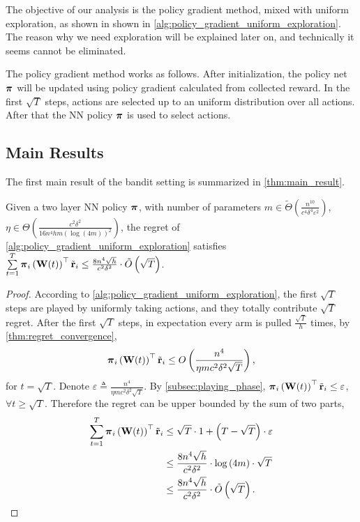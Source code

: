 The objective of our analysis is the policy gradient method, mixed with uniform exploration, as shown in shown in \cref{alg:policy_gradient_uniform_exploration}. The reason why we need exploration will be explained later on, and technically it seems cannot be eliminated.

The policy gradient method works as follows. After initialization, the policy net ${\boldsymbol{\pi}}$ will be updated using policy gradient calculated from collected reward. In the first $\sqrt{T}$ steps, actions are selected up to an uniform distribution over all actions. After that the NN policy ${\boldsymbol{\pi}}$ is used to select actions.

\subsection{Main Results}
\label{subsec:main_results}

The first main result of the bandit setting is summarized in \cref{thm:main_result}.

\begin{thm}
\label{thm:main_result}
    Given a two layer NN policy ${\boldsymbol{\pi}}$, with number of parameters $m \in \tilde{\Theta}\left( \frac{n^{10}}{c^4 \delta^4 \varepsilon^2} \right)$, $\eta \in \Theta\left( \frac{c^2 \delta^2}{16 n^4 h m \left( \log{\left(4m\right)} \right)^2} \right)$, the regret of \cref{alg:policy_gradient_uniform_exploration} satisfies $\sum\limits_{t=1}^{T}{ {\boldsymbol{\pi}}_i\left( {\mathbf{W}}(t) \right)^\top {\tilde{\mathbf{r}}}_i } \le  \frac{8 n^4 \sqrt{h}}{c^2 \delta^2} \cdot \tilde{O}\left( \sqrt{T} \right)$.
\end{thm}
\begin{proof}
According to \cref{alg:policy_gradient_uniform_exploration}, the first $\sqrt{T}$ steps are played by uniformly taking actions, and they totally contribute $\sqrt{T}$ regret. After the first $\sqrt{T}$ steps, in expectation every arm is pulled $\frac{\sqrt{T}}{h}$ times, by \cref{thm:regret_convergence}, 
\begin{equation*}
\begin{split}
    {\boldsymbol{\pi}}_i\left( {\mathbf{W}}(t) \right)^\top {\tilde{\mathbf{r}}}_i \le O\left( \frac{n^4}{\eta m c^2 \delta^2 \sqrt{T}} \right),
\end{split}
\end{equation*}
for $t = \sqrt{T}$. Denote $\varepsilon \triangleq \frac{n^4}{\eta m c^2 \delta^2 \sqrt{T}}$. By \cref{subsec:playing_phase}, ${\boldsymbol{\pi}}_i\left( {\mathbf{W}}(t) \right)^\top {\tilde{\mathbf{r}}}_i \le \varepsilon$, $\forall t \ge \sqrt{T}$. Therefore the regret can be upper bounded by the sum of two parts,
\begin{equation*}
\begin{split}
    \sum\limits_{t=1}^{T}{ {\boldsymbol{\pi}}_i\left( {\mathbf{W}}(t) \right)^\top {\tilde{\mathbf{r}}}_i } &\le \sqrt{T} \cdot 1 + \left(T - \sqrt{T} \right) \cdot \varepsilon \\
    &\le \frac{8 n^4 \sqrt{h}}{c^2 \delta^2} \cdot \log{\left(4m\right)} \cdot \sqrt{T} \\
    &\le \frac{8 n^4 \sqrt{h}}{c^2 \delta^2} \cdot \tilde{O}\left(\sqrt{T}\right). \qedhere
\end{split}
\end{equation*}
\end{proof}

